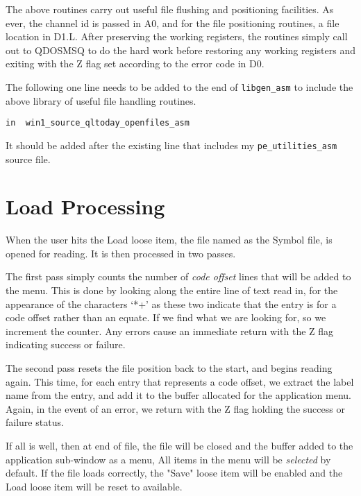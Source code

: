 The above routines carry out useful file flushing and positioning
    facilities. As ever, the channel id is passed in A0, and for the file
    positioning routines, a file location in D1.L. After preserving the
    working registers, the routines simply call out to QDOSMSQ to do the hard
    work before restoring any working registers and exiting with the Z flag
    set according to the error code in D0.

The following one line needs to be added to the end of
 \nolinkurl{libgen_asm} to include the above library of useful
    file handling routines.

\begin{lstlisting}[firstnumber=1,]
         in  win1_source_qltoday_openfiles_asm
\end{lstlisting}

It should be added after the existing line that includes my
 \nolinkurl{pe_utilities_asm} source file.

\section{Load Processing}
\label{ch33-lib-gen-processing}%

When the user hits the Load loose item, the file named as the
    Symbol file, is opened for reading. It is then processed in two
    passes.

The first pass simply counts the number of \emph{code offset
 }lines that will be added to the menu. This is done by looking
    along the entire line of text read in, for the appearance of the
    characters `*+' as these two indicate that the entry is for a code offset
    rather than an equate. If we find what we are looking for, so we increment
    the counter. Any errors cause an immediate return with the Z flag
    indicating success or failure.

The second pass resets the file position back to the start, and
    begins reading again. This time, for each entry that represents a code
    offset, we extract the label name from the entry, and add it to the buffer
    allocated for the application menu. Again, in the event of an error, we
    return with the Z flag holding the success or failure status.

If all is well, then at end of file, the file will be closed and the
    buffer added to the application sub-{}window as a menu, All items in the
    menu will be \emph{selected} by default. If the file loads
    correctly, the "Save" loose item will be enabled and the Load loose item
    will be reset to available.

